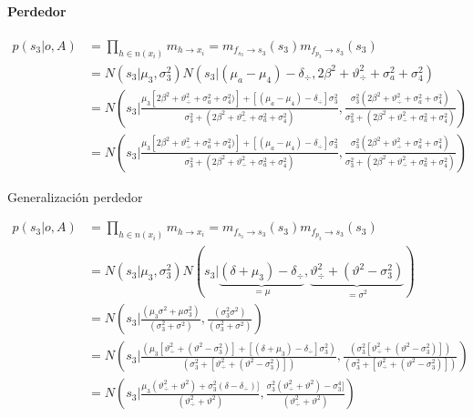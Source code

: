 \documentclass[11pt,twoside, spanish]{report} %
\begin{document}
\paragraph{Perdedor}
\begin{equation}
	\begin{split}
		p(s_3|o,A) &= \prod_{h \in n(x_i)} m_{h \rightarrow x_i} = m_{f_{s_3} \rightarrow s_3}(s_3) m_{f_{p_3} \rightarrow s_3}(s_3) \\
		&=  N(s_3| \mu_3, \sigma_3^2) N(s_3|(\mu_a - \mu_4) - \delta_{\div}, 2\beta^2+\vartheta_{\div}^2 + \sigma_a^2 + \sigma_4^2 )\\
		&= N\left(s_3\Big|  \frac{ \mu_3[2\beta^2+\vartheta_{\div}^2 + \sigma_a^2 + \sigma_4^2 )]+[(\mu_a - \mu_4) - \delta_{\div}]\sigma_3^2}{\sigma_3^2+( 2\beta^2+\vartheta_{\div}^2 + \sigma_a^2 + \sigma_4^2 )} , \frac{\sigma_3^2( 2\beta^2+\vartheta_{\div}^2 + \sigma_a^2 + \sigma_4^2 )}{\sigma_3^2+( 2\beta^2+\vartheta_{\div}^2 + \sigma_a^2 + \sigma_4^2 )} \right) \\
		&= N\left(s_3\Big|  \frac{ \mu_3[2\beta^2+\vartheta_{\div}^2 + \sigma_a^2 + \sigma_4^2 )]+[(\mu_a - \mu_4) - \delta_{\div}]\sigma_3^2}{\sigma_3^2+( 2\beta^2+\vartheta_{\div}^2 + \sigma_a^2 + \sigma_4^2 )} , \frac{\sigma_3^2( 2\beta^2+\vartheta_{\div}^2 + \sigma_a^2 + \sigma_4^2 )}{\sigma_3^2+( 2\beta^2+\vartheta_{\div}^2 + \sigma_a^2 + \sigma_4^2 )} \right)
	\end{split}
\end{equation}

Generalizaci\'on perdedor

\begin{equation}
	\begin{split}
		p(s_3|o,A) &= \prod_{h \in n(x_i)} m_{h \rightarrow x_i} = m_{f_{s_3} \rightarrow s_3}(s_3) m_{f_{p_3} \rightarrow s_3}(s_3) \\
		&=  N(s_3| \mu_3, \sigma_3^2) N( s_3|   \underbrace{(\delta + \mu_3) - \delta_{\div}}_{=\mu} , \underbrace{\vartheta_{\div}^2 + (\vartheta^2 - \sigma_3^2 )}_{=\sigma^2})\\
		&=  N\left(s_3\Big|\frac{(\mu_3\sigma^2+\mu\sigma_3^2)}{(\sigma_3^2+\sigma^2)}, \frac{(\sigma_3^2\sigma^2)}{(\sigma_3^2+\sigma^2)}\right)\\
		&=  N\left(s_3\Big|\frac{(\mu_3[\vartheta_{\div}^2 + (\vartheta^2 - \sigma_3^2 )]+[(\delta + \mu_3) - \delta_{\div}]\sigma_3^2)}{(\sigma_3^2+[\vartheta_{\div}^2 + (\vartheta^2 - \sigma_3^2 )])}, \frac{(\sigma_3^2[\vartheta_{\div}^2 + (\vartheta^2 - \sigma_3^2 )])}{(\sigma_3^2+[\vartheta_{\div}^2 + (\vartheta^2 - \sigma_3^2 )])}\right)\\
		&= N\left(s_3\Big| \frac{\mu_3 (\vartheta_{\div}^2 + \vartheta^2)+\sigma_3^2(\delta-\delta_{\div})]}{(\vartheta_{\div}^2 + \vartheta^2 )},\frac{\sigma_3^2(\vartheta_{\div}^2 + \vartheta^2) - \sigma_3^4 ]}{(\vartheta_{\div}^2 + \vartheta^2)}\right)
	\end{split}
\end{equation}
\end{document}
